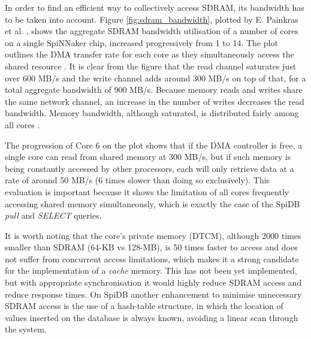In order to find an efficient way to collectively access SDRAM, its bandwidth has to be taken into account. Figure \ref{fig:sdram_bandwidth}, plotted by E. Painkras et al. \cite{painkras}, shows the aggregate SDRAM bandwidth utilisation of a number of cores on a single SpiNNaker chip, increased progressively from 1 to 14. The plot outlines the DMA transfer rate for each core as they simultaneously access the shared resource \cite{multicoresystem}. It is clear from the figure that the read channel saturates just over 600 MB/s and the write channel adds around 300 MB/s on top of that, for a total aggregate bandwidth of 900 MB/s. Because memory reads and writes share the same network channel, an increase in the number of writes decreases the read bandwidth. Memory bandwidth, although saturated, is distributed fairly among all cores \cite{painkras}. 

The progression of Core 6 on the plot shows that if the DMA controller is free, a single core can read from shared memory at 300 MB/s, but if such memory is being constantly accessed by other processors, each will only retrieve data at a rate of around 50 MB/s (6 times slower than doing so exclusively). This evaluation is important because it shows the limitation of all cores frequently accessing shared memory simultaneously, which is exactly the case of the SpiDB \textit{pull} and \textit{SELECT} queries.

It is worth noting that the core's private memory (DTCM), although 2000 times smaller than SDRAM (64-KB vs 128-MB), is 50 times faster to access and does not suffer from concurrent access limitations, which makes it a strong candidate for the implementation of a \textit{cache} memory. This has not been yet implemented, but with appropriate synchronisation it would highly reduce SDRAM access and reduce response times. On SpiDB another enhancement to minimise unnecessary SDRAM access is the use of a hash-table structure, in which the location of values inserted on the database is always known, avoiding a linear scan through the system.
